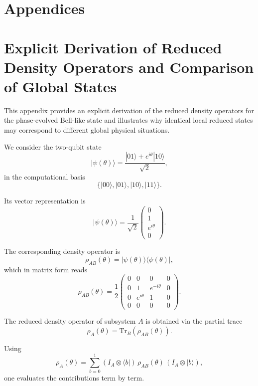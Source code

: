 \documentclass[a4paper]{article}
\begin{document}
\appendix

\section*{Appendices}


\section{Explicit Derivation of Reduced Density Operators and Comparison of Global States}
\label{app:reduced_density_operators}

This appendix provides an explicit derivation of the reduced density operators for the phase-evolved Bell-like state and illustrates why identical local reduced states may correspond to different global physical situations.

We consider the two-qubit state
\[
|\psi(\theta)\rangle = \frac{|01\rangle + e^{i\theta}|10\rangle}{\sqrt{2}},
\]
in the computational basis
\[
\{|00\rangle, |01\rangle, |10\rangle, |11\rangle\}.
\]

Its vector representation is
\[
|\psi(\theta)\rangle =
\frac{1}{\sqrt{2}}
\begin{pmatrix}
0 \\
1 \\
e^{i\theta} \\
0
\end{pmatrix}.
\]

The corresponding density operator is
\[
\rho_{AB}(\theta) = |\psi(\theta)\rangle\langle\psi(\theta)|,
\]
which in matrix form reads
\[
\rho_{AB}(\theta)
=
\frac{1}{2}
\begin{pmatrix}
0 & 0 & 0 & 0 \\
0 & 1 & e^{-i\theta} & 0 \\
0 & e^{i\theta} & 1 & 0 \\
0 & 0 & 0 & 0
\end{pmatrix}.
\]

The reduced density operator of subsystem \(A\) is obtained via the partial trace
\[
\rho_A(\theta) = \mathrm{Tr}_B(\rho_{AB}(\theta)).
\]

Using
\[
\rho_A(\theta)
=
\sum_{b=0}^{1}
(I_A \otimes \langle b|)\,\rho_{AB}(\theta)\,(I_A \otimes |b\rangle),
\]
one evaluates the contributions term by term.
\end{document}
